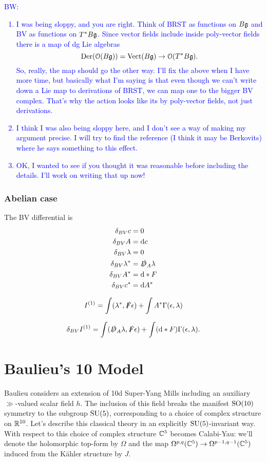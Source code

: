 \documentclass[10pt, oneside]{article}
\renewcommand{\d}{\mathrm{d}}
\newcommand{\cO}{\mathcal{O}}
\newcommand{\brian}[1]{\textcolor{blue}{BW: #1}}
\begin{document}
\brian{
\begin{enumerate}
\item I was being sloppy, and you are right. 
Think of BRST as functions on $B \mathfrak{g}$ and BV as functions on $T^* B\mathfrak{g}$.
Since vector fields include inside poly-vector fields there is a map of dg Lie algebras
\[
{\rm Der}(\cO(B \mf g)) = {\rm Vect}(B \mf g) \to \cO(T^* B \mf g) .
\]
So, really, the map should go the other way.
I'll fix the above when I have more time, but basically what I'm saying is that even though we can't write down a Lie map to derivations of BRST, we can map one to the bigger BV complex.
That's why the action looks like its by poly-vector fields, not just derivations. 
\item
I think I was also being sloppy here, and I don't see a way of making my argument precise. 
I will try to find the reference (I think it may be Berkovits) where he says something to this effect. 
\item
OK, I wanted to see if you thought it was reasonable before including the details. 
I'll work on writing that up now!
\end{enumerate}
}

\subsubsection{Abelian case}

The BV differential is
\begin{align*}
\delta_{BV} c &= 0 \\
\delta_{BV} A &= \d c \\
\delta_{BV} \lambda &= 0 \\
\delta_{BV} \lambda^* &= \sd D_A \lambda \\
\delta_{BV} A^* &= \d\ast F \\
\delta_{BV} c^* &= \d A^*
\end{align*}

\[I^{(1)} = \int (\lambda^*, \slashed{F} \epsilon) + \int A^* \Gamma(\epsilon, \lambda)\]

\[\delta_{BV} I^{(1)} = \int (\sd D_A\lambda, \sd F\epsilon) + \int (\d\ast F) \Gamma(\epsilon, \lambda).\]
\section{Baulieu's 10 Model}

Baulieu \cite{Baulieu} considers an extension of 10d Super-Yang Mills including an auxiliary $\gg$-valued scalar field $h$.  The inclusion of this field breaks the manifest $\mathrm{SO}(10)$ symmetry to the subgroup $\mathrm{SU}(5)$, corresponding to a choice of complex structure on $\mathbb{R}^{10}$.  Let's describe this classical theory in an explicitly $\mathrm{SU}(5)$-invariant way.  With respect to this choice of complex structure $\mathbb{C}^5$ becomes Calabi-Yau: we'll denote the holomorphic top-form by $\Omega$ and the map $\Omega^{p,q}(\mathbb{C}^5) \to \Omega^{p-1,q-1}(\mathbb{C}^5)$ induced from the K\"ahler structure by $J$.
\end{document}
